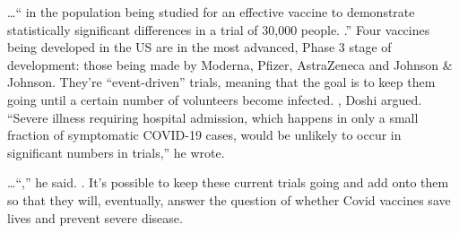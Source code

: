 \begin{refsection}
\begin{tcolorbox}[quote]
\dots{}\enquote{ in the population being studied for an effective vaccine to demonstrate statistically significant differences in a trial of 30,000 people. .} Four vaccines being developed in the US are in the most advanced, Phase 3 stage of development: those being made by Moderna, Pfizer, AstraZeneca and Johnson \& Johnson. They're \enquote{event-driven} trials, meaning that the goal is to keep them going until a certain number of volunteers become infected. , Doshi argued. \enquote{Severe illness requiring hospital admission, which happens in only a small fraction of symptomatic COVID-19 cases, would be unlikely to occur in significant numbers in trials,} he wrote.\textsuperscript{\cite{url0dd44589}}

\end{tcolorbox}

\begin{tcolorbox}[quote]

\dots{}\enquote{,} he said. . It's possible to keep these current trials going and add onto them so that they will, eventually, answer the question of whether Covid vaccines save lives and prevent severe disease.\textsuperscript{\cite{url0dd44589}}

\end{tcolorbox}

\printbibliography[heading=subbibliography]

\end{refsection}